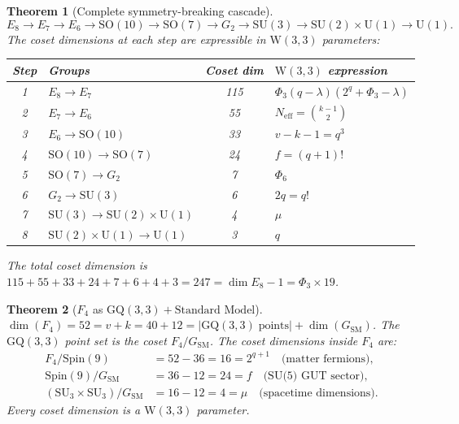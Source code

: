 \documentclass[12pt,a4paper]{article}
\newtheorem{theorem}{Theorem}[section]
\newcommand{\W}{\mathrm{W}(3,3)}
\begin{document}
\begin{theorem}[Complete symmetry-breaking cascade]\label{thm:cascade}
\begin{equation}\label{eq:cascade}
  E_8 \to E_7 \to E_6 \to \mathrm{SO}(10) \to \mathrm{SO}(7)
  \to G_2 \to \mathrm{SU}(3) \to \mathrm{SU}(2)\times\mathrm{U}(1)
  \to \mathrm{U}(1).
\end{equation}
The coset dimensions at each step are expressible in $\W$ parameters:
\begin{center}
\renewcommand{\arraystretch}{1.2}
\begin{tabular}{@{}clcl@{}}
\toprule
Step & Groups & Coset dim & $\W$ expression\\
\midrule
1 & $E_8\to E_7$ & 115 & $\Phi_3(q-\lambda)(2^q+\Phi_3-\lambda)$\\
2 & $E_7\to E_6$ & 55 & $N_{\mathrm{eff}}=\binom{k-1}{2}$\\
3 & $E_6\to\mathrm{SO}(10)$ & 33 & $v-k-1=q^3$\\
4 & $\mathrm{SO}(10)\to\mathrm{SO}(7)$ & 24 & $f=(q+1)!$\\
5 & $\mathrm{SO}(7)\to G_2$ & 7 & $\Phi_6$\\
6 & $G_2\to\mathrm{SU}(3)$ & 6 & $2q=q!$\\
7 & $\mathrm{SU}(3)\to\mathrm{SU}(2)\times\mathrm{U}(1)$ & 4 & $\mu$\\
8 & $\mathrm{SU}(2)\times\mathrm{U}(1)\to\mathrm{U}(1)$ & 3 & $q$\\
\bottomrule
\end{tabular}
\end{center}
The total coset dimension is
$115+55+33+24+7+6+4+3 = 247 = \dim E_8 -1 = \Phi_3\times 19$.
\end{theorem}

\begin{theorem}[$F_4$ as $\mathrm{GQ}(3,3)+\text{Standard Model}$]
\label{thm:f4}
$\dim(F_4)=52=v+k=40+12=|\mathrm{GQ}(3,3)\;\text{points}|+\dim(G_{\mathrm{SM}})$.
The $\mathrm{GQ}(3,3)$ point set is the coset $F_4/G_{\mathrm{SM}}$.
The coset dimensions inside $F_4$ are:
\begin{align}
  F_4/\mathrm{Spin}(9) &= 52-36 = 16 = 2^{q+1}\quad\text{(matter fermions)},\\
  \mathrm{Spin}(9)/G_{\mathrm{SM}} &= 36-12 = 24 = f\quad\text{(SU(5) GUT sector)},\\
  (\mathrm{SU}_3\times\mathrm{SU}_3)/G_{\mathrm{SM}} &= 16-12 = 4 = \mu
    \quad\text{(spacetime dimensions)}.
\end{align}
Every coset dimension is a $\W$ parameter.
\end{theorem}
\end{document}
